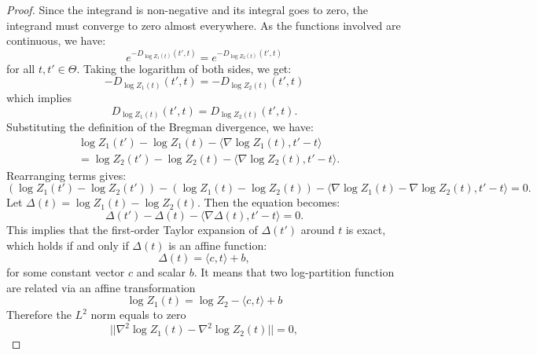 \documentclass{article}
\theoremstyle{plain}
\theoremstyle{definition}
\theoremstyle{remark}
\begin{document}
\begin{proof}
    
Since the integrand is non-negative and its integral goes to zero, the integrand must converge to zero almost everywhere. As the functions involved are continuous, we have:
\begin{equation}
    e^{-D_{\log Z_{1}(t)}(t',t)} = e^{-D_{\log Z_{2}(t)}(t',t)}
\end{equation}
for all $t, t' \in \Theta$. Taking the logarithm of both sides, we get:
\begin{equation}
    -D_{\log Z_{1}(t)}(t',t) = -D_{\log Z_{2}(t)}(t',t)
\end{equation}
which implies
\begin{equation}
    D_{\log Z_{1}(t)}(t',t) = D_{\log Z_{2}(t)}(t',t).
\end{equation}
Substituting the definition of the Bregman divergence, we have:
\begin{align*}
    &\log Z_{1}(t') - \log Z_{1}(t) - \langle \nabla \log Z_{1}(t), t' - t \rangle \\
    &= \log Z_{2}(t') - \log Z_{2}(t) - \langle \nabla \log Z_{2}(t), t' - t \rangle.
\end{align*}
Rearranging terms gives:
\begin{equation}
    (\log Z_{1}(t') - \log Z_{2}(t')) - (\log Z_{1}(t) - \log Z_{2}(t)) - \langle \nabla \log Z_{1}(t) - \nabla \log Z_{2}(t), t' - t \rangle = 0.
\end{equation}
Let $\Delta(t) = \log Z_{1}(t) - \log Z_{2}(t)$. Then the equation becomes:
\begin{equation}
    \Delta(t') - \Delta(t) - \langle \nabla \Delta(t), t' - t \rangle = 0.
\end{equation}
This implies that the first-order Taylor expansion of $\Delta(t')$ around $t$ is exact, which holds if and only if $\Delta(t)$ is an affine function:
\begin{equation}
    \Delta(t) = \langle c, t \rangle + b,
\end{equation}
for some constant vector $c$ and scalar $b$. It means that two log-partition function are related via an affine transformation
\begin{equation}
    \log Z_{1}(t) = \log Z_{2} - \langle c, t \rangle + b
\end{equation}
Therefore the $L^{2}$ norm equals to zero
\begin{equation}
    || \nabla^{2}\log Z_{1}(t) - \nabla^{2}\log Z_{2}(t) || = 0,
\end{equation}
\end{proof}
\end{document}
